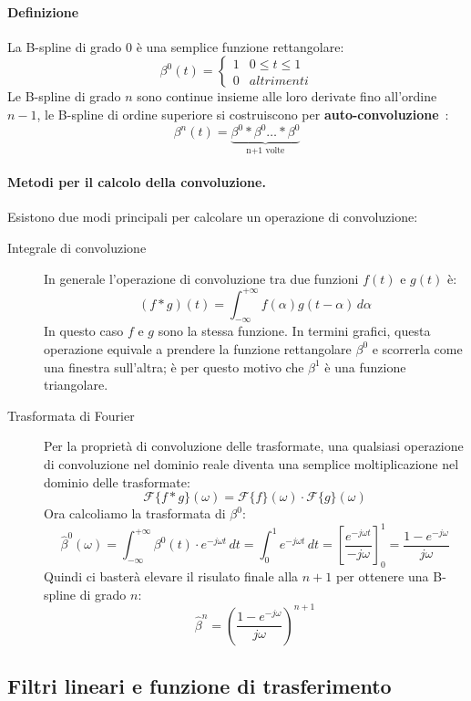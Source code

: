 \paragraph{Definizione} La B-spline di grado $0$ è una semplice funzione rettangolare:
\[
\beta^0(t)= \begin{cases}
	1 & 0\le t\le 1 \\
	0 & altrimenti
\end{cases}
\]
Le B-spline di grado $n$ sono continue insieme alle loro derivate fino all'ordine $n-1$, le B-spline di ordine superiore si costruiscono per \textbf{auto-convoluzione}~\cite{unser1999splines}:
\[
\beta^n(t)=\underbrace{\beta^0*\beta^0\dots*\beta^0}_\text{n+1 volte}
\]

\paragraph{Metodi per il calcolo della convoluzione.} Esistono due modi principali per calcolare un operazione di convoluzione:
\begin{description}
	\item[Integrale di convoluzione]
	In generale l'operazione di convoluzione tra due funzioni $f(t)$ e $g(t)$ è:
	\[
	(f*g)(t)=\int^{+\infty}_{-\infty}{f(\alpha)g(t-\alpha)\,d\alpha} 
	\]
	In questo caso $f$ e $g$ sono la stessa funzione. In termini grafici, questa operazione equivale a prendere la funzione rettangolare $\beta^0$ e scorrerla come una finestra sull'altra; è per questo motivo che $\beta^1$ è una funzione triangolare.
	
	\item[Trasformata di Fourier]
	Per la proprietà di convoluzione delle trasformate, una qualsiasi operazione di convoluzione nel dominio reale diventa una semplice moltiplicazione nel dominio delle trasformate:
	\[
	\mathcal{F}\{f*g\}(\omega)=\mathcal{F}\{f\}(\omega)\cdot\mathcal{F}\{g\}(\omega) 
	\]
	Ora calcoliamo la trasformata di $\beta^0$:
	\[
	\hat{\beta}^0(\omega)=\int^{+\infty}_{-\infty}{\beta}^0(t)\cdot e^{-j\omega t}\,dt=\int^{1}_{0}{e^{-j\omega t}\,dt}=\left[\frac{e^{-j\omega t}}{-j\omega}\right]^1_0=\frac{1-e^{-j\omega}}{j\omega}
	\]
	Quindi ci basterà elevare il risulato finale alla $n+1$ per ottenere una B-spline di grado $n$:
	\[
	\hat{\beta}^n=\left(\frac{1-e^{-j\omega}}{j\omega}\right)^{n+1}
	\]
\end{description}

\subsection{Filtri lineari e funzione di trasferimento}

